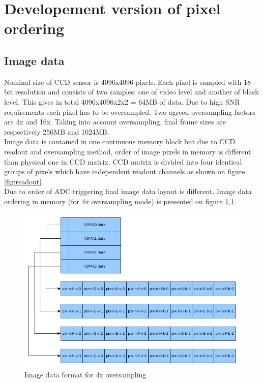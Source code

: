 \chapter{Developement version of pixel ordering}
\section{Image data}
Nominal size of CCD sensor is 4096x4096 pixels. Each pixel is sampled with 18-bit resolution and consists of two samples: one of video level and another of black level. This gives in total 4096x4096x2x2 = 64MB of data. Due to high SNR requirements each pixel has to be oversampled. Two agreed oversampling factors are 4x and 16x. Taking into account oversampling, final frame sizes are respectively 256MB and 1024MB. \\
Image data is contained in one continuous memory block but due to CCD readout and oversampling method, order of image pixels in memory is different than physical one in CCD matrix. CCD matrix is divided into four identical groups of pixels which have independent readout channels as shown on figure \ref{fig:readout}. \\
Due to order of ADC triggering final image data layout is different. Image data ordering in memory (for 4x oversampling mode) is presented on figure \ref{fig:oversample4}.

%

\begin{figure}[H]
\centering
\includegraphics[width=\textwidth]{pict_ipc/image_data_format.png}
\caption{Image data format for 4x oversampling}
\label{fig:oversample4}
\end{figure}

